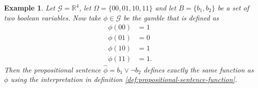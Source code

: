 \documentclass{article}
\theoremstyle{mytheorem}
\newtheorem{definition}[theorem]{Definition}
\newtheorem{lemma}[theorem]{Lemma}
\newtheorem{example}[theorem]{Example}
\newcommand{\func}[1]{\ensuremath{\textsf{#1}}} %
\newcommand{\set}[1]{\ensuremath{\{ #1 \} }} %
\begin{document}
\begin{example} \label{ex:propositional-sentence-function}
Let $\mathcal{G} = \mathbb{R}^4$, let $\Omega = \set{00, 01, 10, 11}$ and let $B = \set{b_1, b_2}$ be a set of two boolean variables. Now take $\phi \in \mathcal{G}$ be the gamble that is defined as
\begin{align*}
\phi(00) &= 1 \\
\phi(01) &= 0 \\
\phi(10) &= 1 \\
\phi(11) &= 1.
\end{align*}
Then the propositional sentence $\hat{\phi} = b_1 \lor \neg b_2$ defines exactly the same function as $\phi$ using the interpretation in definition \ref{def:propositional-sentence-function}.
\end{example}



\end{document}
